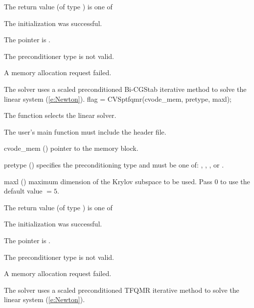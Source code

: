 {
  The return value  (of type ) is one of
  \begin{args}
  \item[\Id{CVSPILS\_SUCCESS}] 
    The {\cvspbcg} initialization was successful.
  \item[\Id{CVSPILS\_MEM\_NULL}]
    The  pointer is .
  \item[\Id{CVSPILS\_ILL\_INPUT}]
    The preconditioner type  is not valid.
  \item[\Id{CVSPILS\_MEM\_FAIL}]
    A memory allocation request failed.
  \end{args}
}
{
  The {\cvspbcg} solver uses a scaled preconditioned Bi-CGStab
  iterative method to solve the linear system (\ref{e:Newton}).
}
{
  flag = CVSptfqmr(cvode\_mem, pretype, maxl);
}
{
  The function  selects the {\cvsptfqmr} linear solver. 

  The user's main function must include the  header file.
}
{
  \begin{args}
  \item[cvode\_mem] ()
    pointer to the {\cvode} memory block.
  \item[pretype] ()
    specifies the preconditioning type and must be one of: 
    , , , or .
  \item[maxl] ()
    maximum dimension of the Krylov subspace to be used. Pass $0$ to use the 
    default value  $= 5$.
  \end{args}
}
{
  The return value  (of type ) is one of
  \begin{args}
  \item[\Id{CVSPILS\_SUCCESS}] 
    The {\cvsptfqmr} initialization was successful.
  \item[\Id{CVSPILS\_MEM\_NULL}]
    The  pointer is .
  \item[\Id{CVSPILS\_ILL\_INPUT}]
    The preconditioner type  is not valid.
  \item[\Id{CVSPILS\_MEM\_FAIL}]
    A memory allocation request failed.
  \end{args}
}
{
  The {\cvsptfqmr} solver uses a scaled preconditioned TFQMR
  iterative method to solve the linear system (\ref{e:Newton}).
}

